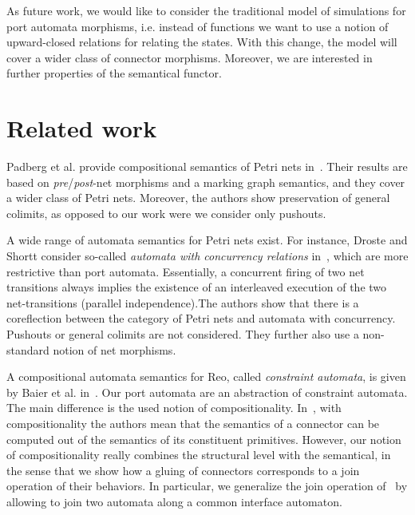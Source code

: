 \documentclass[copyright,creativecommons]{eptcs}
\begin{document}
As future work, we would like to consider the traditional model 
of simulations for port automata morphisms, i.e. instead
of functions we want to use a notion of upward-closed relations 
for relating the states. With this change, the model will cover 
a wider class of connector morphisms. Moreover, we are 
interested in further properties of the semantical functor.

\section{Related work}
\label{sec:related-work}

Padberg et al. provide compositional semantics of Petri nets
in~\cite{PER01}. Their results are based on 
\emph{pre}/\emph{post}-net morphisms and a marking graph semantics,
and they cover a wider class of Petri nets. Moreover, the 
authors show preservation of general colimits, as opposed 
to our work were we consider only pushouts.

A wide range of automata semantics for Petri nets exist. 
For instance, Droste 
and Shortt consider so-called \emph{automata
with concurrency relations} in~\cite{DS02}, which are more 
restrictive than port automata. Essentially, a concurrent 
firing of two net transitions always implies the existence 
of an interleaved execution of the two net-transitions 
(parallel independence).The authors show that there is a
coreflection between the category of Petri nets and automata 
with concurrency.
Pushouts or general colimits are not considered.
They further also use a non-standard notion of net morphisms.

A compositional automata semantics for Reo,
called \emph{constraint automata}, is
given by Baier et al. in~\cite{BSAR06}. 
Our port automata are an abstraction of 
constraint automata. The main difference
is the used notion of compositionality.
In~\cite{BSAR06}, with compositionality 
the authors mean that the semantics of a 
connector can be computed out of the semantics
of its constituent primitives. However, our
notion of compositionality really combines
the structural level with the semantical,
in the sense that we show how a gluing of
connectors corresponds to a join operation
of their behaviors. In particular, we generalize
the join operation of~\cite{BSAR06} by allowing
to join two automata along a common interface 
automaton.

\nocite{BCEH05}

 
 
\end{document}
